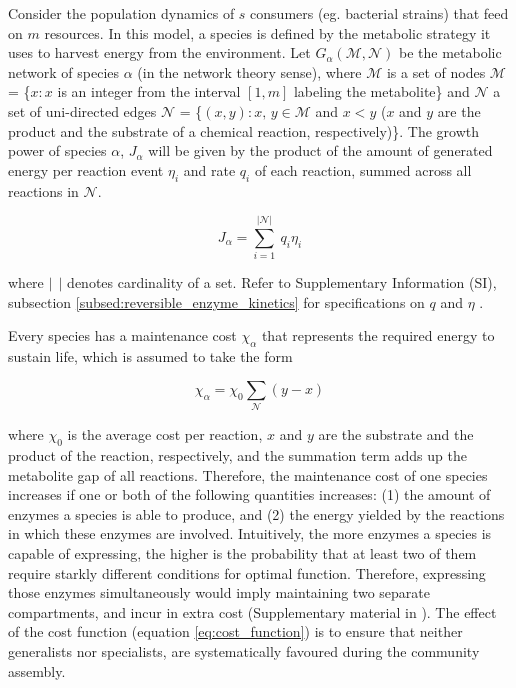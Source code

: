 \documentclass[titlepage,11pt]{article}
\begin{document}
\begin{linenumbers}
\begin{figure}
				\end{figure} 
				Consider the population dynamics of $ s $ consumers (eg. bacterial strains) that feed on $ m $ resources. In this model,  a species  is defined by the metabolic strategy it uses to harvest energy from the environment. Let $ G_{\alpha}(\mathcal{M}, \mathcal{N}) $ be the metabolic network of species $ \alpha $ (in the network theory sense), where $ \mathcal{M} $ is a set of nodes $ \mathcal{M}  $ = \{$x:x $ is an integer from the interval $ [1, m]  $ labeling the metabolite\} and $ \mathcal{N} $ a set of uni-directed edges $ \mathcal{N}  $ = \{$ (x, y): x \textrm{, } y \in \mathcal{M} $ and $ x < y $ ($ x $ and $ y $ are the product and the substrate of a chemical reaction, respectively)\}. The growth power of species $ \alpha $,  $ J_{\alpha}$ will be given by the product of the amount of generated energy per reaction event $ \eta_{i} $ and rate $ q_{i} $ of each reaction, summed across all reactions in $ \mathcal{N} $.
				\begin{linenomath*}	
					\begin{equation}
					J_{\alpha} = \sum_{i = 1}^{|\mathcal{N}|} \ q_i \eta_i
					\end{equation}
				\end{linenomath*}
				where $ | \ \ | $ denotes cardinality of a set. Refer to Supplementary Information (SI), subsection \ref{subsed:reversible_enzyme_kinetics} for specifications on $ q $ and  $ \eta $ .\par
				Every species has a maintenance cost $ \chi_{\alpha} $ that represents the required energy to sustain life, which is assumed to take the form
				\begin{linenomath*}	
					\begin{equation}\label{eq:cost_function}
					\chi_{\alpha} = \chi_0\sum_{\mathcal{N}}(y - x)
					\end{equation}
				\end{linenomath*}
				where $ \chi_0 $ is the average cost per reaction, $ x $ and $ y $ are the substrate and the product of the reaction, respectively, and the summation term adds up the metabolite gap of all reactions. Therefore, the maintenance cost of one species increases if one or both of the following quantities increases: (1) the amount of enzymes a species is able to produce, and (2) the energy yielded by the reactions in which these enzymes are involved. Intuitively, the more enzymes a species is capable of expressing, the higher is the probability that at least two of them require starkly different conditions for optimal function. Therefore, expressing those enzymes simultaneously would imply maintaining two separate compartments, and incur in extra cost (Supplementary material in \citet{Tikhonov2017}). The effect of the cost function (equation \ref{eq:cost_function}) is to ensure that neither generalists nor specialists, are systematically favoured during the community assembly.\par 

\end{linenumbers}
\end{document}
